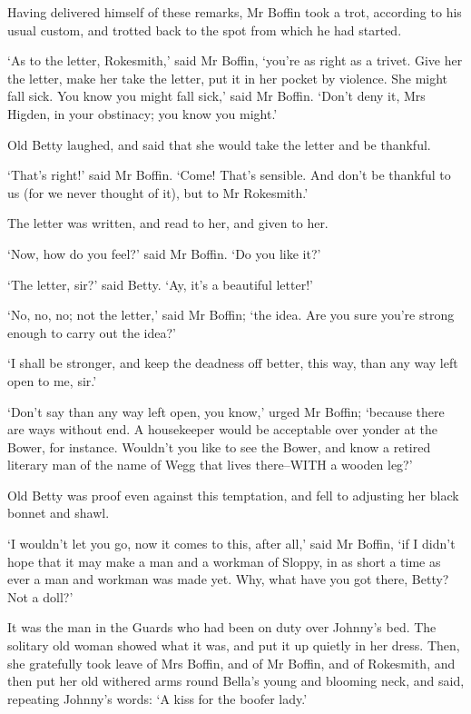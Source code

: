 Having delivered himself of these remarks, Mr Boffin took a trot,
according to his usual custom, and trotted back to the spot from which
he had started.

‘As to the letter, Rokesmith,’ said Mr Boffin, ‘you’re as right as a
trivet. Give her the letter, make her take the letter, put it in her
pocket by violence. She might fall sick. You know you might fall sick,’
said Mr Boffin. ‘Don’t deny it, Mrs Higden, in your obstinacy; you know
you might.’

Old Betty laughed, and said that she would take the letter and be
thankful.

‘That’s right!’ said Mr Boffin. ‘Come! That’s sensible. And don’t be
thankful to us (for we never thought of it), but to Mr Rokesmith.’

The letter was written, and read to her, and given to her.

‘Now, how do you feel?’ said Mr Boffin. ‘Do you like it?’

‘The letter, sir?’ said Betty. ‘Ay, it’s a beautiful letter!’

‘No, no, no; not the letter,’ said Mr Boffin; ‘the idea. Are you sure
you’re strong enough to carry out the idea?’

‘I shall be stronger, and keep the deadness off better, this way, than
any way left open to me, sir.’

‘Don’t say than any way left open, you know,’ urged Mr Boffin; ‘because
there are ways without end. A housekeeper would be acceptable over
yonder at the Bower, for instance. Wouldn’t you like to see the
Bower, and know a retired literary man of the name of Wegg that lives
there--WITH a wooden leg?’

Old Betty was proof even against this temptation, and fell to adjusting
her black bonnet and shawl.

‘I wouldn’t let you go, now it comes to this, after all,’ said Mr
Boffin, ‘if I didn’t hope that it may make a man and a workman of
Sloppy, in as short a time as ever a man and workman was made yet. Why,
what have you got there, Betty? Not a doll?’

It was the man in the Guards who had been on duty over Johnny’s bed.
The solitary old woman showed what it was, and put it up quietly in her
dress. Then, she gratefully took leave of Mrs Boffin, and of Mr Boffin,
and of Rokesmith, and then put her old withered arms round Bella’s young
and blooming neck, and said, repeating Johnny’s words: ‘A kiss for the
boofer lady.’

